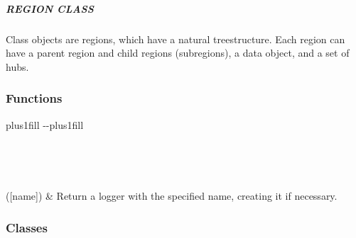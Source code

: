 \documentclass[letterpaper,10pt,english]{sphinxmanual}
\begin{document}
\subparagraph{REGION CLASS}
\label{\detokenize{src.models.hydrogen.network.region:region-class}}
\sphinxAtStartPar
Class objects are regions, which have a natural tree\sphinxhyphen{}structure. Each region can have a parent region
and child regions (subregions), a data object, and a set of hubs.
\subsubsection*{Functions}


\begin{savenotes}
\sphinxatlongtablestart
\sphinxthistablewithglobalstyle
\sphinxthistablewithnovlinesstyle
\makeatletter
  \LTleft \@totalleftmargin plus1fill
  \LTright\dimexpr\columnwidth-\@totalleftmargin-\linewidth\relax plus1fill
\makeatother
\begin{longtable}{}
\sphinxtoprule
\endfirsthead

\\
\sphinxtoprule
\endhead

\sphinxbottomrule
{}\\
\endfoot

\endlastfoot
\sphinxtableatstartofbodyhook

\sphinxAtStartPar
{}({[}name{]})
&
\sphinxAtStartPar
Return a logger with the specified name, creating it if necessary.
\\
\sphinxbottomrule
\end{longtable}
\sphinxtableafterendhook
\sphinxatlongtableend
\end{savenotes}
\subsubsection*{Classes}
\end{document}
